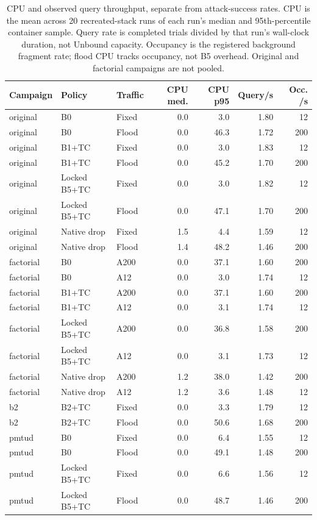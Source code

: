 \begin{table}[t]
\centering
\caption{CPU and observed query throughput, separate from attack-success rates. CPU is the mean across 20 recreated-stack runs of each run's median and 95th-percentile container sample. Query rate is completed trials divided by that run's wall-clock duration, not Unbound capacity. Occupancy is the registered background fragment rate; flood CPU tracks occupancy, not B5 overhead. Original and factorial campaigns are not pooled.}
\label{tab:runtime-cpu-throughput}
\begingroup
\fontsize{9}{10.8}\selectfont
\setlength{\tabcolsep}{3pt}
\begin{tabular}{lllrrrr}
\hline
Campaign & Policy & Traffic & CPU med. & CPU p95 & Query/s & Occ. /s \\
\hline
original & B0 & Fixed & 0.0 & 3.0 & 1.80 & 12 \\
original & B0 & Flood & 0.0 & 46.3 & 1.72 & 200 \\
original & B1+TC & Fixed & 0.0 & 3.0 & 1.83 & 12 \\
original & B1+TC & Flood & 0.0 & 45.2 & 1.70 & 200 \\
original & Locked B5+TC & Fixed & 0.0 & 3.0 & 1.82 & 12 \\
original & Locked B5+TC & Flood & 0.0 & 47.1 & 1.70 & 200 \\
original & Native drop & Fixed & 1.5 & 4.4 & 1.59 & 12 \\
original & Native drop & Flood & 1.4 & 48.2 & 1.46 & 200 \\
factorial & B0 & A200 & 0.0 & 37.1 & 1.60 & 200 \\
factorial & B0 & A12 & 0.0 & 3.0 & 1.74 & 12 \\
factorial & B1+TC & A200 & 0.0 & 37.1 & 1.60 & 200 \\
factorial & B1+TC & A12 & 0.0 & 3.1 & 1.74 & 12 \\
factorial & Locked B5+TC & A200 & 0.0 & 36.8 & 1.58 & 200 \\
factorial & Locked B5+TC & A12 & 0.0 & 3.1 & 1.73 & 12 \\
factorial & Native drop & A200 & 1.2 & 38.0 & 1.42 & 200 \\
factorial & Native drop & A12 & 1.2 & 3.6 & 1.48 & 12 \\
b2 & B2+TC & Fixed & 0.0 & 3.3 & 1.79 & 12 \\
b2 & B2+TC & Flood & 0.0 & 50.6 & 1.68 & 200 \\
pmtud & B0 & Fixed & 0.0 & 6.4 & 1.55 & 12 \\
pmtud & B0 & Flood & 0.0 & 49.1 & 1.48 & 200 \\
pmtud & Locked B5+TC & Fixed & 0.0 & 6.6 & 1.56 & 12 \\
pmtud & Locked B5+TC & Flood & 0.0 & 48.7 & 1.46 & 200 \\
\hline
\end{tabular}
\endgroup
\end{table}
